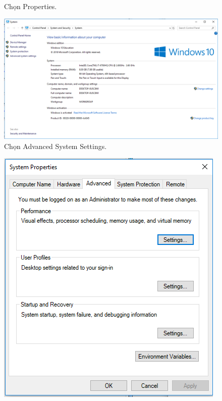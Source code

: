 \begin{enumerate}
\begin{center}
\begin{figure}[htp]
\begin{center}
    \end{center}
    \caption{Chọn Properties.}
    \label{refhinh1}
    \end{figure}
\end{center}
\begin{center}
    \begin{figure}[htp]
    \begin{center}
     \includegraphics[scale=0.4]{image3/advanced}
    \end{center}
    \caption{Chọn Advanced System Settings.}
    \label{refhinh1}
    \end{figure}
\end{center}
\begin{center}
    \begin{figure}[htp]
    \begin{center}
     \includegraphics[scale=0.5]{image3/adv}

\end{center}
\end{figure}
\end{center}
\end{enumerate}
